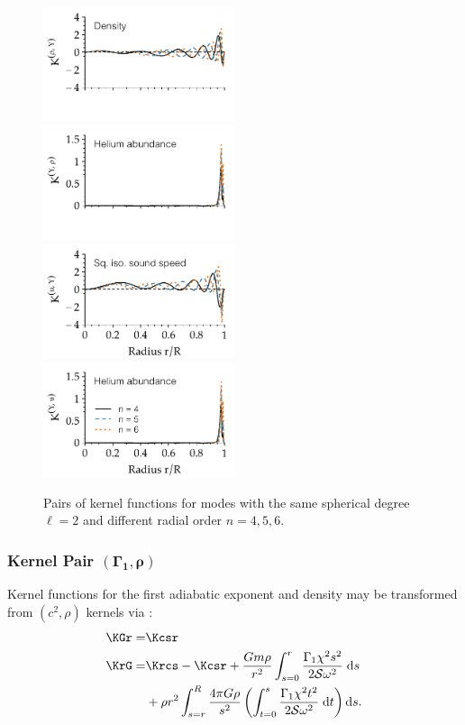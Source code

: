 {\begin{figure}
    \includegraphics[width=0.5\textwidth,trim={0 1.1cm 0 0}, clip]{figs/pulse/kernels/kernel-n-rho_Y-diffusion.pdf}%
    \includegraphics[width=0.5\textwidth,trim={0 1.1cm 0 0}, clip]{figs/pulse/kernels/kernel-n-Y_rho-diffusion.pdf}\\
    \includegraphics[width=0.5\textwidth]{figs/pulse/kernels/kernel-n-u_Y-diffusion.pdf}%
    \includegraphics[width=0.5\textwidth]{figs/pulse/kernels/kernel-n-Y_u-diffusion.pdf}
    \caption[Kernel functions (same $\ell$, different $n$)]{Pairs of kernel functions for modes with the same spherical degree ${\ell=2}$ and different radial order ${n=4},5,6$. \label{fig:same-ell}}
\end{figure}
}

\subsubsection*{Kernel Pair \texorpdfstring{$\mathbf{(\Gamma_1, \rho)}$}{(Gamma1,rho)}}
\noindent
Kernel functions for the first adiabatic exponent and density may be transformed from ${(c^2, \rho)}$ kernels via \citep[e.g.][Equations~104-105]{InversionKit}:
\begin{align}
    \KGr =& \Kcsr
\\  \KrG =& \Krcs - \Kcsr + \frac{G m \rho}{r^2} \int_{s=0}^r \frac{\Gamma_1 \chi^2 s^2}{2 \mathcal{S} \omega^2} \; \text{d}s
\\\notag   &+ \rho r^2 \int_{s=r}^R \frac{4\pi G \rho}{s^2} \left( \int_{t=0}^s \frac{\Gamma_1 \chi^2 t^2}{2 \mathcal{S} \omega^2} \; \text{d}t \right) \text{d}s.
\end{align}

